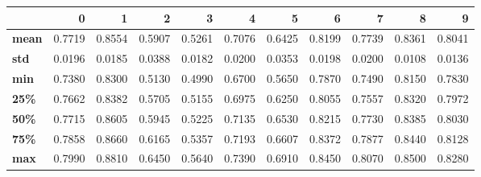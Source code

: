 \begin{tabular}{lrrrrrrrrrr}
\toprule
{} &       0 &       1 &       2 &       3 &       4 &       5 &       6 &       7 &       8 &       9 \\
\midrule
\textbf{mean} &  0.7719 &  0.8554 &  0.5907 &  0.5261 &  0.7076 &  0.6425 &  0.8199 &  0.7739 &  0.8361 &  0.8041 \\
\textbf{std } &  0.0196 &  0.0185 &  0.0388 &  0.0182 &  0.0200 &  0.0353 &  0.0198 &  0.0200 &  0.0108 &  0.0136 \\
\textbf{min } &  0.7380 &  0.8300 &  0.5130 &  0.4990 &  0.6700 &  0.5650 &  0.7870 &  0.7490 &  0.8150 &  0.7830 \\
\textbf{25\% } &  0.7662 &  0.8382 &  0.5705 &  0.5155 &  0.6975 &  0.6250 &  0.8055 &  0.7557 &  0.8320 &  0.7972 \\
\textbf{50\% } &  0.7715 &  0.8605 &  0.5945 &  0.5225 &  0.7135 &  0.6530 &  0.8215 &  0.7730 &  0.8385 &  0.8030 \\
\textbf{75\% } &  0.7858 &  0.8660 &  0.6165 &  0.5357 &  0.7193 &  0.6607 &  0.8372 &  0.7877 &  0.8440 &  0.8128 \\
\textbf{max } &  0.7990 &  0.8810 &  0.6450 &  0.5640 &  0.7390 &  0.6910 &  0.8450 &  0.8070 &  0.8500 &  0.8280 \\
\bottomrule
\end{tabular}
